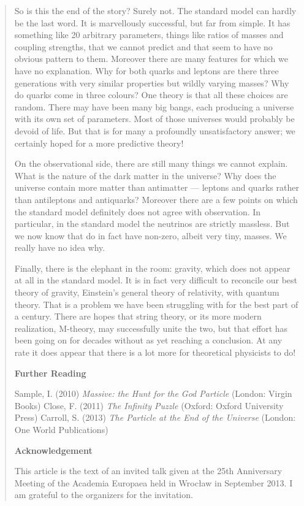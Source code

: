 \begin{quote}
So is this the end of the story? Surely not. The standard model can hardly be the last word. It is marvellously successful, but far from simple. It has something like 20 arbitrary parameters, things like ratios of masses and coupling strengths, that we cannot predict and that seem to have no obvious pattern to them. Moreover there are many features for which we have no explanation. Why for both quarks and leptons are there three generations with very similar properties but wildly varying masses? Why do quarks come in three colours? One theory is that all these choices are random. There may have been many big bangs, each producing a universe with its own set of parameters. Most of those universes would probably be devoid of life. But that is for many a profoundly unsatisfactory answer; we certainly hoped for a more predictive theory!

On the observational side, there are still many things we cannot explain. What is the nature of the dark matter in the universe? Why does the universe contain more matter than antimatter — leptons and quarks rather than antileptons and antiquarks? Moreover there are a few points on which the standard model definitely does not agree with observation. In particular, in the standard model the neutrinos are strictly massless. But we now know that do in fact have non-zero, albeit very tiny, masses. We really have no idea why.

Finally, there is the elephant in the room: gravity, which does not appear at all in the standard model. It is in fact very difficult to reconcile our best theory of gravity, Einstein’s general theory of relativity, with quantum theory. That is a problem we have been struggling with for the best part of a century. There are hopes that string theory, or its more modern realization, M-theory, may successfully unite the two, but that effort has been going on for decades without as yet reaching a conclusion. At any rate it does appear that there is a lot more for theoretical physicists to do!

\textbf{Further Reading}

Sample, I. (2010) \emph{Massive: the Hunt for the God Particle} (London: Virgin Books)
Close, F. (2011) \emph{The Infinity Puzzle} (Oxford: Oxford University Press)
Carroll, S. (2013) \emph{The Particle at the End of the Universe} (London: One World Publications)

\textbf{Acknowledgement}

This article is the text of an invited talk given at the 25th Anniversary Meeting of the Academia Europaea held in Wrocław in September 2013. I am grateful to the organizers for the invitation.
\end{quote}

